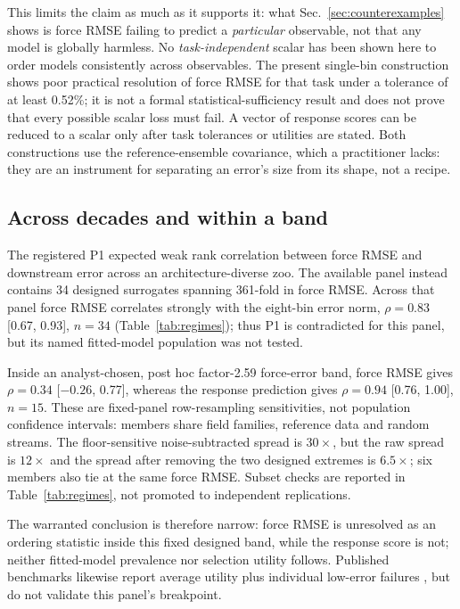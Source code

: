 \documentclass[aip,jcp,reprint,amsmath,amssymb,floatfix]{revtex4-2}
\begin{document}
This limits the claim as much as it supports it: what
Sec.~\ref{sec:counterexamples} shows is force RMSE failing to predict
a \emph{particular} observable, not that any model is globally harmless. No
\emph{task-independent} scalar has been shown here to order models consistently
across observables. The present single-bin construction shows poor practical
resolution of force RMSE for that task under a tolerance of at least 0.52\%; it
is not a formal statistical-sufficiency result and does not prove that every
possible scalar loss must fail. A vector of response scores can be reduced to a
scalar only after task tolerances or utilities are stated. Both constructions use
the reference-ensemble covariance, which a practitioner lacks: they are an
instrument for separating an error's size from its shape, not a recipe.

\subsection{Across decades and within a band}
\label{sec:regimes}

The registered P1 expected weak rank correlation between force RMSE and
downstream error across an architecture-diverse zoo. The available panel instead
contains 34 designed surrogates spanning 361-fold in force RMSE. Across that
panel force RMSE correlates strongly with the eight-bin error norm,
$\rho=0.83$ [0.67, 0.93], $n=34$ (Table~\ref{tab:regimes}); thus P1 is
contradicted for this panel, but its named fitted-model population was not tested.

Inside an analyst-chosen, post hoc factor-2.59 force-error band, force RMSE gives
$\rho=0.34$ [$-0.26$, 0.77], whereas the response prediction gives
$\rho=0.94$ [0.76, 1.00], $n=15$. These are fixed-panel row-resampling
sensitivities, not population confidence intervals: members share field
families, reference data and random streams. The floor-sensitive
noise-subtracted spread is $30\times$, but the raw spread is $12\times$ and the
spread after removing the two designed extremes is $6.5\times$; six members
also tie at the same force RMSE. Subset checks are reported in
Table~\ref{tab:regimes}, not promoted to independent replications.

The warranted conclusion is therefore narrow: force RMSE is unresolved as an
ordering statistic inside this fixed designed band, while the response score is
not; neither fitted-model prevalence nor selection utility follows. Published
benchmarks likewise report average utility plus individual low-error failures
\cite{Gawkowski2026}, but do not validate this panel's breakpoint.
\end{document}
